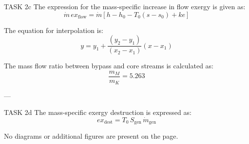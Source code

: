 TASK 2c  
The expression for the mass-specific increase in flow exergy is given as:  
\[
\dot{m} \, ex_{\text{flow}} = \dot{m} \left[ h - h_0 - T_0 \left( s - s_0 \right) + ke \right]
\]  

The equation for interpolation is:  
\[
y = y_1 + \frac{\left( y_2 - y_1 \right)}{\left( x_2 - x_1 \right)} \left( x - x_1 \right)
\]  

The mass flow ratio between bypass and core streams is calculated as:  
\[
\frac{m_M}{m_K} = 5.263
\]  

---

TASK 2d  
The mass-specific exergy destruction is expressed as:  
\[
ex_{\text{dest}} = T_0 \, S_{\text{gen}} \, \dot{m}_{\text{gen}}
\]  

No diagrams or additional figures are present on the page.